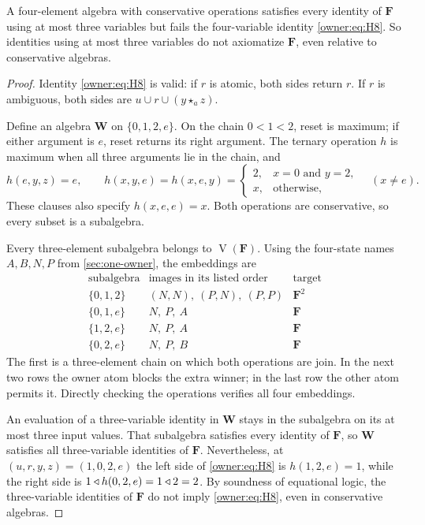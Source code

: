 \begin{proposition}\label{owner:prop:four-variables}
A four-element algebra with conservative operations satisfies every
identity of $\mathbf F$ using at most three variables but fails the
four-variable identity \eqref{owner:eq:H8}. So identities using at most
three variables do not axiomatize $\mathbf F$, even relative to
conservative algebras.
\end{proposition}
\begin{proof}
Identity \eqref{owner:eq:H8} is valid: if $r$ is atomic,
both sides return $r$. If $r$ is ambiguous, both sides are
$u\cup r\cup(y\star_a z)$.

Define an algebra $\mathbf W$ on $\{0,1,2,e\}$. On the chain
$0<1<2$, reset is maximum; if either argument is $e$, reset returns
its right argument. The ternary operation $h$ is maximum when all
three arguments lie in the chain, and
\[
 h(e,y,z)=e,\qquad
 h(x,y,e)=h(x,e,y)=
 \begin{cases}2,&x=0\text{ and }y=2,\\x,&\text{otherwise},\end{cases}
 \quad(x\ne e).
\]
These clauses also specify $h(x,e,e)=x$. Both operations are
conservative, so every subset is a subalgebra.

Every three-element subalgebra belongs to $\operatorname V(\mathbf F)$.
Using the four-state names $A,B,N,P$ from \cref{sec:one-owner}, the
embeddings are
\[
\begin{array}{c|c|c}
\text{subalgebra}&\text{images in its listed order}&\text{target}\\\hline
\{0,1,2\}&(N,N),\ (P,N),\ (P,P)&\mathbf F^2\\
\{0,1,e\}&N,\ P,\ A&\mathbf F\\
\{1,2,e\}&N,\ P,\ A&\mathbf F\\
\{0,2,e\}&N,\ P,\ B&\mathbf F
\end{array}
\]
The first is a three-element chain on which both operations are
join. In the next two rows the owner atom blocks the extra winner;
in the last row the other atom permits it. Directly checking the
operations verifies all four embeddings.

An evaluation of a three-variable identity in $\mathbf W$ stays in
the subalgebra on its at most three input values. That subalgebra
satisfies every identity of $\mathbf F$, so $\mathbf W$ satisfies
all three-variable identities of $\mathbf F$. Nevertheless, at
$(u,r,y,z)=(1,0,2,e)$ the left side of
\eqref{owner:eq:H8} is $h(1,2,e)=1$, while the right
side is $1\mathbin{\triangleleft} h(0,2,e)=1\mathbin{\triangleleft}2=2$. By soundness of equational logic,
the three-variable identities of $\mathbf F$ do not imply
\eqref{owner:eq:H8}, even in conservative algebras.
\end{proof}

